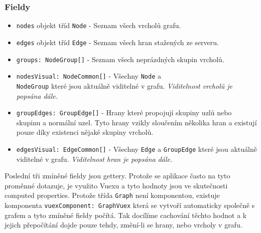 \subsubsection*{Fieldy}
\begin{itemize}
  \item \texttt{nodes} objekt tříd \texttt{Node} - Seznam všech vrcholů grafu.
  \item \texttt{edges} objekt tříd \texttt{Edge} - Seznam všech hran stažených ze serveru.
  \item \texttt{groups: NodeGroup[]} - Seznam všech neprázdných skupin vrcholů.
  \item \texttt{nodesVisual: NodeCommon[]} - Všechny \texttt{Node} a \\\texttt{NodeGroup} které jsou aktuálně viditelné v grafu. \textit{Viditelnost vrcholů je popsána dále.}
  \item \texttt{groupEdges: GroupEdge[]} - Hrany které propojují skupiny uzlů nebo skupinu a normální uzel. Tyto hrany vzikly sloučením několika hran a existují pouze díky existenci nějaké skupiny vrcholů.
  \item \texttt{edgesVisual: EdgeCommon[]} - Všechny \texttt{Edge} a \texttt{GroupEdge} které jsou aktuálně viditelné v grafu. \textit{Viditelnost hran je popsána dále.}
\end{itemize}

Poslední tři zmíněné fieldy jsou gettery. Protože se aplikace často na tyto proměnné dotazuje, je využito Vuexu a tyto hodnoty jsou ve skutečnosti computed properties. Protože třída \texttt{Graph} není komponentou, existuje komponenta \texttt{vuexComponent: GraphVuex} která se vytvoří automaticky společně s grafem a tyto zmíněné fieldy počítá. Tak docílíme cachování těchto hodnot a k jejich přepočítání dojde pouze tehdy, změní-li se hrany, nebo vrcholy v grafu.

